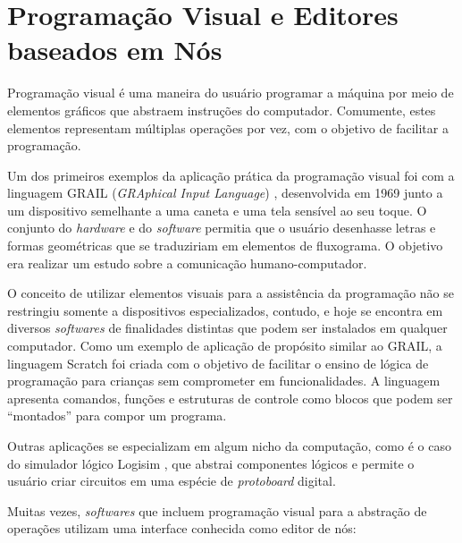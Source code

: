 \documentclass[
	12pt,				%
	openright,			%
	oneside,			%
	a4paper,			%
	main=brazil,
	english,			%
	]{ufsj-abntex2}
\begin{document}


\section{Programação Visual e Editores baseados em Nós}
\label{sec:programacao-visual}

Programação visual é uma maneira do usuário programar a máquina por meio de elementos gráficos que abstraem instruções do computador. Comumente, estes elementos representam múltiplas operações por vez, com o objetivo de facilitar a programação.

Um dos primeiros exemplos da aplicação prática da programação visual foi com a linguagem GRAIL (\textit{GRAphical Input Language}) \cite{grail}, desenvolvida em 1969 junto a um dispositivo semelhante a uma caneta e uma tela sensível ao seu toque. O conjunto do \textit{hardware} e do \textit{software} permitia que o usuário desenhasse letras e formas geométricas que se traduziriam em elementos de fluxograma. O objetivo era realizar um estudo sobre a comunicação humano-computador.

O conceito de utilizar elementos visuais para a assistência da programação não se restringiu somente a dispositivos especializados, contudo, e hoje se encontra em diversos \textit{softwares} de finalidades distintas que podem ser instalados em qualquer computador. Como um exemplo de aplicação de propósito similar ao GRAIL, a linguagem Scratch \cite{scratchlang} foi criada com o objetivo de facilitar o ensino de lógica de programação para crianças sem comprometer em funcionalidades. A linguagem apresenta comandos, funções e estruturas de controle como blocos que podem ser ``montados'' para compor um programa.

Outras aplicações se especializam em algum nicho da computação, como é o caso do simulador lógico Logisim \cite{logisim}, que abstrai componentes lógicos e permite o usuário criar circuitos em uma espécie de \textit{protoboard} digital.

Muitas vezes, \textit{softwares} que incluem programação visual para a abstração de operações utilizam uma interface conhecida como editor de nós:
\end{document}
